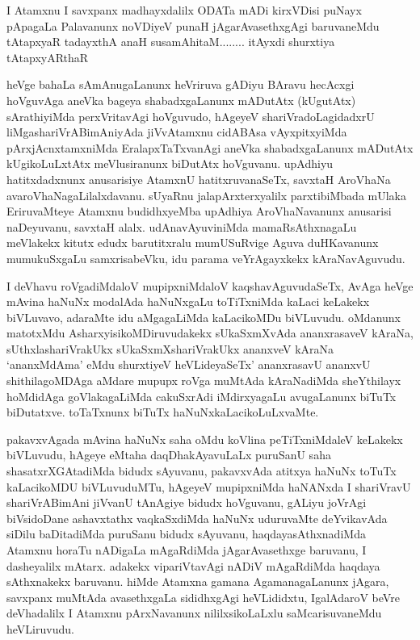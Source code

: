 \begin{artha}
I Atamxnu I savxpanx madhayxdalilx ODATa mADi kirxVDisi puNayx pApagaLa Palavanunx noVDiyeV punaH jAgarAvasethxgAgi baruvaneMdu tAtapxyaR tadayxthA anaH susamAhitaM........ itAyxdi shurxtiya tAtapxyARthaR
\end{artha}


\begin{artha}
heVge bahaLa sAmAnugaLanunx heVriruva gADiyu BAravu hecAcxgi hoVguvAga aneVka bageya shabadxgaLanunx mADutAtx (kUgutAtx) sArathiyiMda perxVritavAgi hoVguvudo, hAgeyeV shariVradoLagidadxrU liMgashariVrABimAniyAda jiVvAtamxnu cidABAsa vAyxpitxyiMda pArxjAcnxtamxniMda EralapxTaTxvanAgi aneVka shabadxgaLanunx mADutAtx kUgikoLuLxtAtx meVlusiranunx biDutAtx hoVguvanu. upAdhiyu hatitxdadxnunx anusarisiye AtamxnU hatitxruvanaSeTx, savxtaH AroVhaNa avaroVhaNagaLilalxdavanu. sUyaRnu jalapArxterxyalilx parxtibiMbada mUlaka EriruvaMteye Atamxnu budidhxyeMba upAdhiya AroVhaNavanunx anusarisi naDeyuvanu, savxtaH alalx. udAnavAyuviniMda mamaRsAthxnagaLu meVlakekx kitutx edudx barutitxralu mumUSuRvige Aguva duHKavanunx mumukuSxgaLu samxrisabeVku, idu parama veYrAgayxkekx kAraNavAguvudu.  
\end{artha}


\begin{artha}
I deVhavu roVgadiMdaloV mupipxniMdaloV kaqshavAguvudaSeTx, AvAga heVge mAvina haNuNx modalAda haNuNxgaLu toTiTxniMda kaLaci keLakekx biVLuvavo, adaraMte idu aMgagaLiMda kaLacikoMDu biVLuvudu. oMdanunx matotxMdu AsharxyisikoMDiruvudakekx sUkaSxmXvAda ananxrasaveV kAraNa, sUthxlashariVrakUkx sUkaSxmXshariVrakUkx ananxveV kAraNa `ananxMdAma' eMdu shurxtiyeV heVLideyaSeTx' ananxrasavU ananxvU shithilagoMDAga aMdare mupupx roVga muMtAda kAraNadiMda sheYthilayx hoMdidAga goVlakagaLiMda cakuSxrAdi iMdirxyagaLu avugaLanunx biTuTx biDutatxve. toTaTxnunx biTuTx haNuNxkaLacikoLuLxvaMte. 
\end{artha}%

\begin{artha}
pakavxvAgada mAvina haNuNx saha oMdu koVlina peTiTxniMdaleV keLakekx biVLuvudu, hAgeye eMtaha daqDhakAyavuLaLx puruSanU saha shasatxrXGAtadiMda bidudx sAyuvanu, pakavxvAda atitxya haNuNx toTuTx kaLacikoMDU biVLuvuduMTu, hAgeyeV mupipxniMda haNANxda I shariVravU shariVrABimAni jiVvanU tAnAgiye bidudx hoVguvanu, gALiyu joVrAgi biVsidoDane ashavxtathx vaqkaSxdiMda haNuNx uduruvaMte deYvikavAda siDilu baDitadiMda puruSanu bidudx sAyuvanu, haqdayasAthxnadiMda Atamxnu horaTu nADigaLa mAgaRdiMda jAgarAvasethxge baruvanu, I dasheyalilx mAtarx. adakekx vipariVtavAgi nADiV mAgaRdiMda haqdaya sAthxnakekx baruvanu. hiMde Atamxna gamana AgamanagaLanunx jAgara, savxpanx muMtAda avasethxgaLa sididhxgAgi heVLididxtu, IgalAdaroV beVre deVhadalilx I Atamxnu pArxNavanunx nililxsikoLaLxlu saMcarisuvaneMdu heVLiruvudu.
\end{artha}

